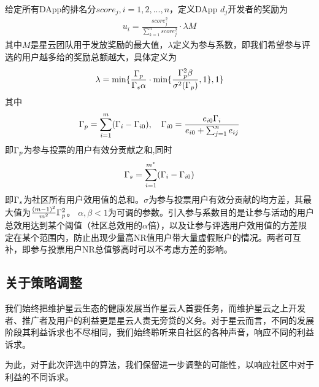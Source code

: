 给定所有DApp的排名分$score_j,i=1,2,...,n$，定义DApp $d_j$开发者的奖励为
\begin{align}
u_i = \frac{score_j^2}{\sum_{k=1}^n score_j^2}\cdot \lambda M
\end{align}
其中$M$是星云团队用于发放奖励的最大值，$\lambda $定义为参与系数，即我们希望参与评选的用户越多给的奖励总额越大，具体定义为
\begin{align}
\lambda=\min\{\frac{\Gamma_p}{\Gamma_s \alpha}\cdot \min\{\frac{\Gamma_p^2 \beta}{\sigma^2(\Gamma_p)},1\},1\}
\end{align}
其中$$\Gamma_p = \sum_{i=1}^m (\Gamma_i-\Gamma_{i0}),~~~\Gamma_{i0} = \frac{e_{i0}\Gamma_i}{e_{i0}+\sum_{j=1}^n {e_{ij}}}$$
即$\Gamma_p$为参与投票的用户有效分贡献之和,同时$$\Gamma_s = \sum_{i=1}^{m^*} (\Gamma_i-\Gamma_{i0})$$即$\Gamma_s$为社区所有用户效用值的总和。$\sigma$为参与投票用户有效分贡献的均方差，其最大值为$\frac{(m-1)^2}{m^2}\Gamma_p^2$。
$\alpha,\beta<1$为可调的参数。引入参与系数目的是让参与活动的用户总效用达到某个阈值（社区总效用的$\alpha$倍），以及让参与评选用户效用值的方差限定在某个范围内，防止出现少量高NR值用户带大量虚假账户的情况。两者可互补，即参与投票用户NR总值够高时可以不考虑方差的影响。
\subsection{关于策略调整}
我们始终把维护星云生态的健康发展当作星云人首要任务，而维护星云之上开发者、推广者及用户的利益更是星云人责无旁贷的义务。对于星云而言，不同的发展阶段其利益诉求也不尽相同，我们始终聆听来自社区的各种声音，响应不同的利益诉求。

为此，对于此次评选中的算法，我们保留进一步调整的可能性，以响应社区中对于利益的不同诉求。
